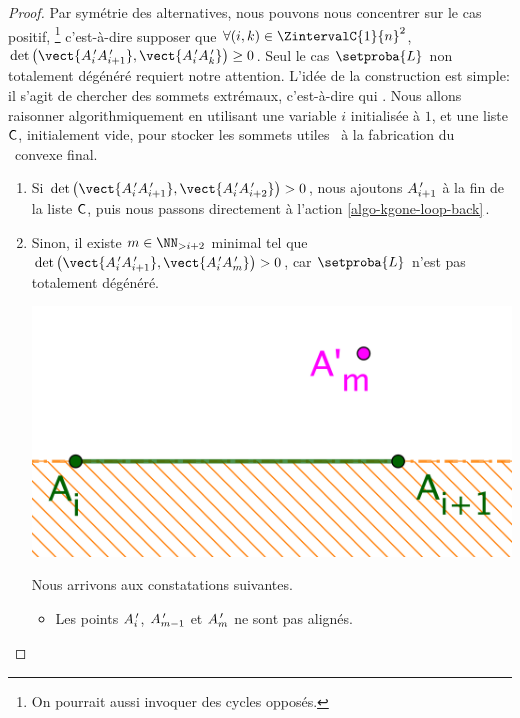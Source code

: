 \begin{proof}
    Par symétrie des alternatives, nous pouvons nous concentrer sur le cas positif,%
    \footnote{
        On pourrait aussi invoquer des cycles opposés.
    }
    c'est-à-dire supposer que 
    $\forall (i, k) \in \ZintervalC{1}{n}^2$,
	$\det \big( \vect{\primeit{A}_i \primeit{A}_{i+1}}, \vect{\primeit{A}_i \primeit{A}_k} \big) \geq 0$.
	Seul le cas $\setproba{L}$ non totalement dégénéré requiert notre attention.
	L'idée de la construction est simple: il s'agit de chercher des sommets extrémaux, c'est-à-dire qui .
	Nous allons raisonner algorithmiquement en utilisant une variable $i$ initialisée à $1$, 
	et
	une liste $\mathsf{C}$, initialement vide, pour stocker les sommets \og utiles \fg\ à la fabrication du \kgone\ convexe final.
	\begin{enumerate}[label=\fbox{\small\bfseries\textsf{A\kern.25pt\arabic*}}]
    	\item \label{algo-kgone-start}
	    Si 
		$\det \big( \vect{\primeit{A}_i \primeit{A}_{i+1}}, \vect{\primeit{A}_i \primeit{A}_{i+2}} \big) > 0$,
		nous ajoutons $A^{\,\prime}_{i+1}$ à la fin de la liste $\mathsf{C}$,
		puis nous passons directement à l'action \ref{algo-kgone-loop-back}\,.


	    \item \label{algo-kgone-remove-vertices}
        Sinon, il existe 
	    $m \in \NN_{>i+2}$ minimal tel que
		$\det \big( \vect{\primeit{A}_i \primeit{A}_{i+1}}, \vect{\primeit{A}_i \primeit{A}_m} \big) > 0$, car $\setproba{L}$ n'est pas totalement dégénéré.
        \begin{center}
        	\includegraphics[scale=.2]{content/polygon/at-least-one/algo-kgone-remove-vertices.png}
        \end{center}
        
        \noindent
        Nous arrivons aux constatations suivantes.
        \begin{itemize}
            \item Les points $A^{\,\prime}_i$, $A^{\,\prime}_{m-1}$ et $A^{\,\prime}_m$ ne sont pas alignés.


\end{itemize}
\end{enumerate}
\end{proof}
